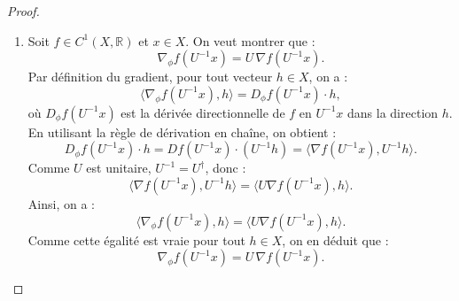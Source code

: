 \documentclass[a4paper,10pt]{article}
\theoremstyle{definition} %
\theoremstyle{definition} %
\theoremstyle{definition} %
\theoremstyle{definition} %
\newcommand{\R}{\mathbb{R}}
\begin{document}
\begin{proof}
\begin{enumerate}[label=(\roman*)]
        \item Soit \( f \in C^1(X, \R) \) et \( x \in X \). On veut montrer que :
        \[
        \nabla_\phi f(U^{-1}x) = U \, \nabla f(U^{-1}x).
        \]
        Par définition du gradient, pour tout vecteur \( h \in X \), on a :
        \[
        \langle \nabla_\phi f(U^{-1}x), h \rangle = D_\phi f(U^{-1}x) \cdot h,
        \]
        où \( D_\phi f(U^{-1}x) \) est la dérivée directionnelle de \( f \) en \( U^{-1}x \) dans la direction \( h \). En utilisant la règle de dérivation en chaîne, on obtient :
        \[
        D_\phi f(U^{-1}x) \cdot h = D f(U^{-1}x) \cdot (U^{-1} h) = \langle \nabla f(U^{-1}x), U^{-1} h \rangle.
        \]
        Comme \( U \) est unitaire, \( U^{-1} = U^\dagger \), donc :
        \[
        \langle \nabla f(U^{-1}x), U^{-1} h \rangle = \langle U \nabla f(U^{-1}x), h \rangle.
        \]
        Ainsi, on a :
        \[
        \langle \nabla_\phi f(U^{-1}x), h \rangle = \langle U \nabla f(U^{-1}x), h \rangle.
        \]
        Comme cette égalité est vraie pour tout \( h \in X \), on en déduit que :
        \[
        \nabla_\phi f(U^{-1}x) = U \, \nabla f(U^{-1}x).
        \]
    \end{enumerate}
\end{proof}
\end{document}
